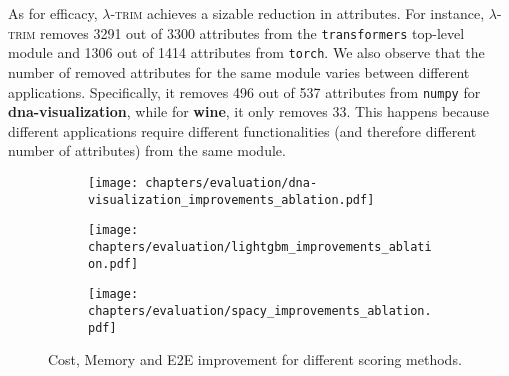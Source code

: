 \documentclass[sigplan,screen]{acmart}
\newcommand{\sys}{\textsc{\ensuremath{\lambda}-trim}\xspace}
\newcommand{\application}[1]{{\textcolor{pennblue}{\textbf{#1}}}}
\newcommand{\module}[1]{{\texttt{#1}}}
\begin{document}
As for efficacy, \sys achieves a sizable reduction in attributes.
For instance, \sys removes 3291 out of 3300 attributes from the \module{transformers} top-level module and 1306 out of 1414 attributes from \module{torch}.
We also observe that the number of removed attributes for the same module varies between different applications.
Specifically, it removes 496 out of 537 attributes from \module{numpy} for \application{dna-visualization}, while for \application{wine}, it only removes 33.
This happens because different applications require different functionalities (and therefore different number of attributes) from the same module.




\begin{figure}[t]
    \centering
\begin{subfigure}[b]{\linewidth}
        \centering
        \texttt{[image: chapters/evaluation/dna-visualization\_improvements\_ablation.pdf]}
        \label{fig:sub1}
    \end{subfigure}



\begin{subfigure}[b]{\linewidth}
        \centering
        \texttt{[image: chapters/evaluation/lightgbm\_improvements\_ablation.pdf]}
        \label{fig:sub2}
    \end{subfigure}



\begin{subfigure}[b]{\linewidth}
        \centering
        \texttt{[image: chapters/evaluation/spacy\_improvements\_ablation.pdf]}
    \end{subfigure}
    
    \caption{Cost, Memory and E2E improvement for different scoring methods.}
    \label{fig:ablation}
\end{figure}
\end{document}
